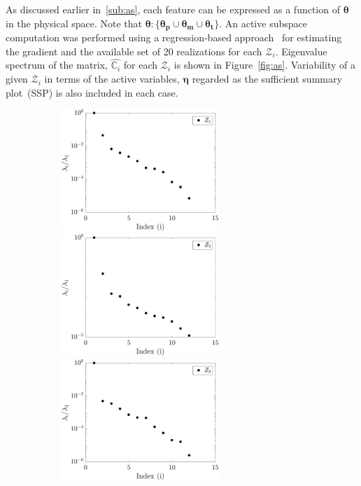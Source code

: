 As discussed earlier in~\ref{sub:as}, each feature can be expressed as a function of $\bm{\theta}$ in the physical
space. Note that $\bm{\theta}:\{\bm{\theta_p}\cup\bm{\theta_m}\cup\bm{\theta_t}\}$. An active subspace computation
was performed using a regression-based approach~\cite{Constantine:2015, Vohra:2019}
for estimating the gradient and the available set of 20 realizations for each $\mathcal{Z}_i$. 
Eigenvalue spectrum of the matrix, $\hat{\mathbb{C}_i}$ for each $\mathcal{Z}_i$ is shown in Figure~\ref{fig:as}.
Variability of a given $\mathcal{Z}_i$ in terms of the active variables, $\bm{\eta}$ regarded as the sufficient summary
plot~(SSP) is also included in each case.
%
\begin{figure}[htbp]
\begin{center}
\begin{subfigure}{0.35\textwidth}
\includegraphics[width=0.65\textwidth]{./Figures/eig_Zf1} 
\\
\includegraphics[width=0.65\textwidth]{./Figures/eig_Zf2} 
\\
\includegraphics[width=0.65\textwidth]{./Figures/eig_Zf3} 

\end{subfigure}
\end{center}
\end{figure}
